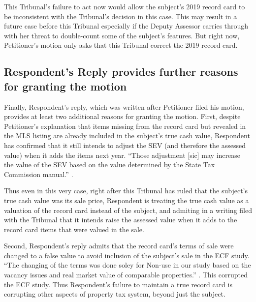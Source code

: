 \documentclass[12pt,\documentclassflag]{michiganCourtOfAppealsBrief}
\begin{document}
This Tribunal's failure to act now would allow the subject's 2019 record card to be inconsistent with the Tribunal's decision in this case. This may result in a future case before this Tribunal especially if the Deputy Assessor carries through with her threat to double-count some of the subject's features. But right now, Petitioner's motion only asks that this Tribunal correct the 2019 record card.

\subsection{Respondent's Reply provides further reasons for granting the motion}

Finally, Respondent's reply, which was written after Petitioner filed his motion, provides at least two additional reasons for granting the motion. First, despite Petitioner's explanation that items missing from the record card but revealed in the MLS listing are already included in the subject's true cash value, Respondent has confirmed that it still intends to adjust the SEV (and therefore the assessed value) when it adds the items next year. ``Those adjustment [sic] may increase the value of the SEV based on the value determined by the State Tax Commission manual.'' .

Thus even in this very case, right after this Tribunal has ruled that the subject's true cash value was its sale price, Respondent is treating the true cash value as a valuation of the record card instead of the subject, and admiting in a writing filed with the Tribunal that it intends raise the assessed value when it adds to the record card items that were valued in the sale.

Second, Respondent's reply admits that the record card's terms of sale were changed to a false value to avoid inclusion of the subject's sale in the ECF study. ``The changing of the terms was done soley for Non-use in our study based on the vacancy issues and real market value of comparable properties.'' . This corrupted the ECF study. Thus Respondent's failure to maintain a true record card is corrupting other aspects of property tax system, beyond just the subject.


\end{document}
